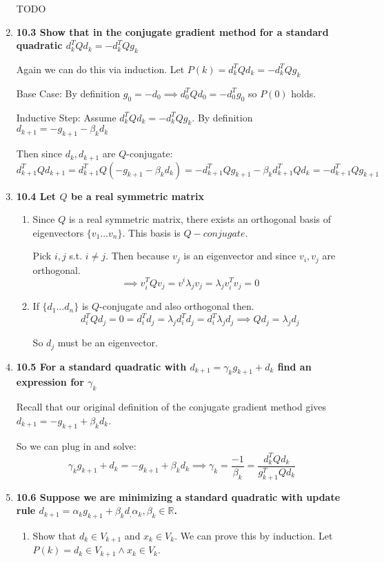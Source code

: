 \documentclass[10pt,a4paper]{article}
\begin{document}
\begin{enumerate}
    TODO
     
    \item \textbf{10.3 Show that in the conjugate gradient method for a standard quadratic $d_k^TQd_k = - d_k^TQg_k$}
    
    Again we can do this via induction. Let $P(k) = d_k^TQd_k = - d_k^TQg_k$

    Base Case: By definition $g_0  = - d_0 \implies d_0^TQd_0 = -d_0^Tg_0$ so $P(0)$ holds.

    Inductive Step: Assume $d_k^TQd_k = -d_k^TQg_k$. By definition $d_{k+1} = - g_{k+1} - \beta_k d_k$

    Then since $d_k, d_{k+1}$ are $Q$-conjugate:
    $$d_{k+1}^TQd_{k+1} = d_{k+1}^TQ(-g_{k+1} - \beta_k d_k) = -d_{k+1}^TQg_{k+1} - \beta_kd_{k+1}^TQd_k = -d_{k+1}^TQg_{k+1}$$

    
    
    \item \textbf{10.4 Let $Q$ be a real symmetric matrix}
    \begin{enumerate}
        \item Since $Q$ is a real symmetric matrix, there exists an orthogonal basis of eigenvectors $\{v_1 \ldots v_n\}$.
        This basis is $Q-conjugate$. 

        Pick $i, j$ s.t. $i \neq j$. Then because $v_j$ is an eigenvector and since $v_i, v_j$ are orthogonal.
        $$\implies v_i^TQv_j = v^i\lambda_jv_j = \lambda_j v_i^Tv_j = 0$$

        \item If $\{d_1 \ldots d_n\}$ is $Q$-conjugate and also orthogonal then.
        $$d_i^TQd_j = 0 = d_i^Td_j = \lambda_j d_i^Td_j = d_i^T \lambda_j d_j \implies Qd_j = \lambda_jd_j$$

        So $d_j$ must be an eigenvector.
    \end{enumerate}

    \item \textbf{10.5 For a standard quadratic with $d_{k+1} = \gamma_k g_{k+1}+d_k$ find an expression for $\gamma_k$}
    
    Recall that our original definition of the conjugate gradient method gives $d_{k+1} = -g_{k+1} + \beta_k d_k$.

    So we can plug in and solve: $$\gamma_k g_{k+1}+d_k =  -g_{k+1} + \beta_k d_k \implies \gamma_k = \frac{-1}{\beta_k} = \frac{d_k^TQd_k}{g_{k+1}^TQd_k}$$


    \item \textbf{10.6 Suppose we are minimizing a standard quadratic with update rule $d_{k+1} = \alpha_k g_{k+1} +\beta_k d_, \alpha_k, \beta_k \in \mathbb{R}$. }
    \begin{enumerate}
        \item Show that $d_k \in V_{k+1}$ and $x_k \in V_k$. 
        We can prove this by induction. Let $P(k) = d_k \in V_{k+1} \land x_k \in V_k$.


\end{enumerate}
\end{enumerate}
\end{document}
